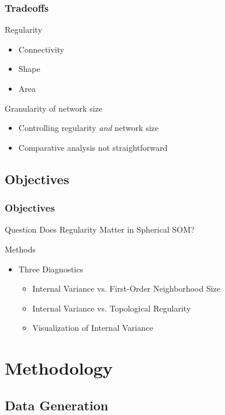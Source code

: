 \documentclass[nototal,handout]{beamer}
\begin{document}
\begin{frame}
	\frametitle{Tradeoffs}
 
\begin{block}{Regularity}
 \begin{itemize}
 \item  Connectivity
 \item  Shape
 \item  Area
 \end{itemize}
 \end{block} 
\begin{block}{Granularity of network size}
 \begin{itemize}
 \item  Controlling regularity \emph{and} network size  
 \item  Comparative analysis not straightforward
 \end{itemize}
 \end{block} \end{frame} 

\subsection{Objectives} 

\begin{frame}
	\frametitle{Objectives}
 
\begin{block}{Question}
  Does Regularity Matter in Spherical SOM?
 \end{block} 
\begin{block}{Methods}
 \begin{itemize}
 \item  Three Diagnostics
 \begin{itemize}
 \item  Internal Variance vs. First-Order Neighborhood Size
 \item  Internal Variance vs. Topological Regularity
 \item  Visualization of Internal Variance
 \end{itemize}
 \end{itemize}
 \end{block} \end{frame} 


\section{Methodology} 

\subsection{Data Generation} 
\end{document}
